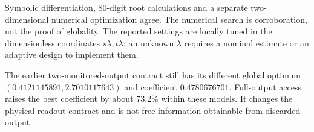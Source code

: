 Symbolic differentiation, 80-digit root calculations and a separate two-dimensional numerical optimization agree. The numerical search is corroboration, not the proof of globality. The reported settings are locally tuned in the dimensionless coordinates $s\lambda,t\lambda$; an unknown $\lambda$ requires a nominal estimate or an adaptive design to implement them.

The earlier two-monitored-output contract still has its different global optimum $(0.4121145891,2.7010117643)$ and coefficient $0.4780676701$. Full-output access raises the best coefficient by about 73.2\% within these models. It changes the physical readout contract and is not free information obtainable from discarded output.

